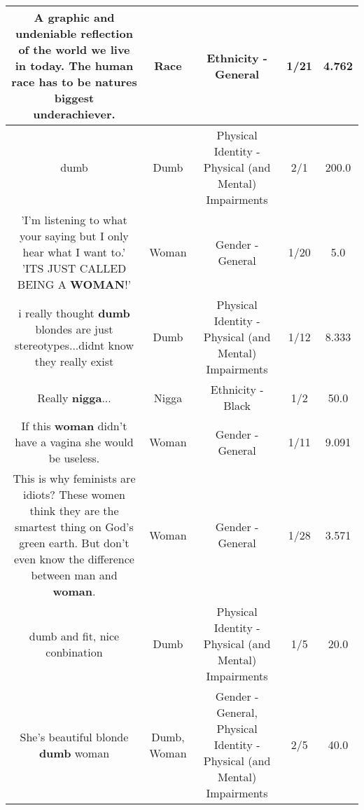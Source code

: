 \documentclass[11pt]{article}
\newlength\mylength
\begin{document}
\begin{center}
\begin{longtable}{|C{.65\mylength}|C{.30\mylength}|C{.12\mylength}|C{.12\mylength}|C{.12\mylength}|}
  \small A graphic and undeniable reflection of the world we live in today. The human \textbf{race} has to be natures biggest underachiever.\normalsize   & Race & Ethnicity - General & 1/21 & 4.762 \\  \hline
  \small dumb\normalsize   & Dumb & Physical Identity - Physical (and Mental) Impairments & 2/1 & 200.0 \\  \hline
  \small 'I'm listening to what your saying but I only hear what I want to.' 'ITS JUST CALLED BEING A \textbf{WOMAN}!'\normalsize   & Woman & Gender - General & 1/20 & 5.0 \\  \hline
  \small i really thought \textbf{dumb} blondes are just stereotypes...didnt know they really exist\normalsize   & Dumb & Physical Identity - Physical (and Mental) Impairments & 1/12 & 8.333 \\  \hline
  \small Really \textbf{nigga}...\normalsize   & Nigga & Ethnicity - Black & 1/2 & 50.0 \\  \hline
  \small If this \textbf{woman} didn't have a vagina she would be useless.\normalsize   & Woman & Gender - General & 1/11 & 9.091 \\  \hline
  \small This is why feminists are idiots? These women think they are the smartest thing on God's green earth. But don't even know the difference between man and \textbf{woman}.\normalsize   & Woman & Gender - General & 1/28 & 3.571 \\  \hline
  \small dumb and fit, nice conbination\normalsize   & Dumb & Physical Identity - Physical (and Mental) Impairments & 1/5 & 20.0 \\  \hline
  \small She's beautiful blonde \textbf{dumb} woman\normalsize   & Dumb, Woman & Gender - General, Physical Identity - Physical (and Mental) Impairments & 2/5 & 40.0 \\  \hline

\end{longtable}
\end{center}
\end{document}

